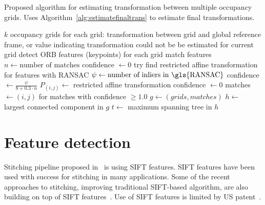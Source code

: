 \begin{algorithm}
    \caption{Proposed algorithm for estimating transformation between multiple occupancy grids. Uses Algorithm~\ref{alg:estimatefinaltrans} to estimate final transformations.}
    \label{alg:estimategridtrasform}
    \begin{algorithmic}[1]
        \Require $k$ occupancy grids
        \Ensure for each grid: transformation between grid and global reference frame, or value indicating transformation could not be be estimated for current grid
            \State detect \gls{ORB} features (keypoints) for each grid
             
            	\State match features
            	\State $n \gets \text{number of matches}$
            		\State confidence $\gets 0$
            	\Else
            		\State try find restricted affine transformation for features with \gls{RANSAC}
            		\State $\psi \gets \text{number of inliers in \gls{RANSAC}}$
            			\State confidence $\gets \frac{\psi}{8 + 0.3 \cdot n}$
                        \State $P_{(i,j)} \gets$ restricted affine transformation
            		\Else
            			\State confidence $\gets 0$
            		\EndIf
            	\EndIf
            \EndFor
            \State matches $\gets (i,j)$ for matches with confidence $\ge 1.0$
            \State $g \gets (grids, matches)$
            \State $h \gets$ largest connected component in $g$
            \State $t \gets$ maximum spanning tree in $h$
            \State {} 
        \EndProcedure
    \end{algorithmic}
\end{algorithm}


\section{Feature detection} %
\label{sec:featuredetection}

Stitching pipeline proposed in~\cite{Brown2006} is using \gls{SIFT} features. \gls{SIFT} features have been used with success for stitching in many applications. Some of the recent approaches to stitching, improving traditional \gls{SIFT}-based algorithm, are also building on top of \gls{SIFT} features~\cite{Xie2015}. Use of \gls{SIFT} features is limited by US patent~\cite{lowe2004method}.

